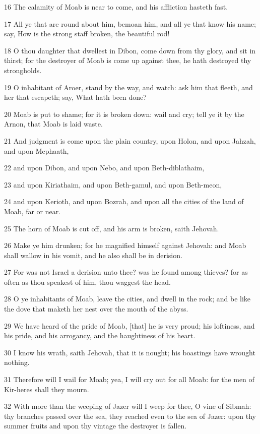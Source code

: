 \par 16 The calamity of Moab is near to come, and his affliction hasteth fast.
\par 17 All ye that are round about him, bemoan him, and all ye that know his name; say, How is the strong staff broken, the beautiful rod!
\par 18 O thou daughter that dwellest in Dibon, come down from thy glory, and sit in thirst; for the destroyer of Moab is come up against thee, he hath destroyed thy strongholds.
\par 19 O inhabitant of Aroer, stand by the way, and watch: ask him that fleeth, and her that escapeth; say, What hath been done?
\par 20 Moab is put to shame; for it is broken down: wail and cry; tell ye it by the Arnon, that Moab is laid waste.
\par 21 And judgment is come upon the plain country, upon Holon, and upon Jahzah, and upon Mephaath,
\par 22 and upon Dibon, and upon Nebo, and upon Beth-diblathaim,
\par 23 and upon Kiriathaim, and upon Beth-gamul, and upon Beth-meon,
\par 24 and upon Kerioth, and upon Bozrah, and upon all the cities of the land of Moab, far or near.
\par 25 The horn of Moab is cut off, and his arm is broken, saith Jehovah.
\par 26 Make ye him drunken; for he magnified himself against Jehovah: and Moab shall wallow in his vomit, and he also shall be in derision.
\par 27 For was not Israel a derision unto thee? was he found among thieves? for as often as thou speakest of him, thou waggest the head.
\par 28 O ye inhabitants of Moab, leave the cities, and dwell in the rock; and be like the dove that maketh her nest over the mouth of the abyss.
\par 29 We have heard of the pride of Moab, [that] he is very proud; his loftiness, and his pride, and his arrogancy, and the haughtiness of his heart.
\par 30 I know his wrath, saith Jehovah, that it is nought; his boastings have wrought nothing.
\par 31 Therefore will I wail for Moab; yea, I will cry out for all Moab: for the men of Kir-heres shall they mourn.
\par 32 With more than the weeping of Jazer will I weep for thee, O vine of Sibmah: thy branches passed over the sea, they reached even to the sea of Jazer: upon thy summer fruits and upon thy vintage the destroyer is fallen.
